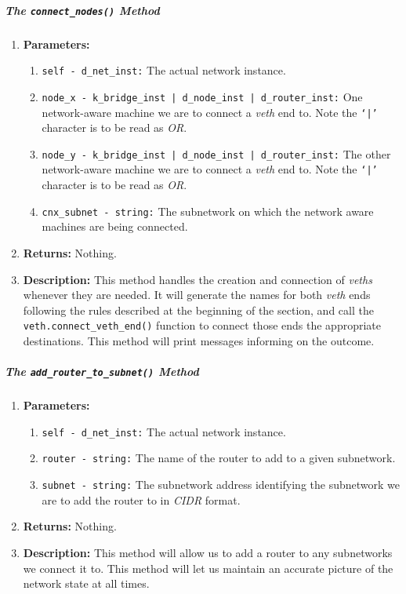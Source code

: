         \subparagraph{The \texttt{connect\_nodes()} Method}
            \begin{enumerate}
                \item \textbf{Parameters:}
                \begin{enumerate}
                    \item \texttt{self - d\_net\_inst:} The actual network instance.
                    \item \texttt{node\_x - k\_bridge\_inst | d\_node\_inst | d\_router\_inst:} One network-aware machine we are to connect a \textit{veth} end to. Note the \texttt{`|'} character is to be read as \textit{OR}.
                    \item \texttt{node\_y - k\_bridge\_inst | d\_node\_inst | d\_router\_inst:} The other network-aware machine we are to connect a \textit{veth} end to. Note the \texttt{`|'} character is to be read as \textit{OR}.
                    \item \texttt{cnx\_subnet - string:} The subnetwork on which the network aware machines are being connected.
                \end{enumerate}
                \item \textbf{Returns:} Nothing.
                \item \textbf{Description:} This method handles the creation and connection of \textit{veths} whenever they are needed. It will generate the names for both \textit{veth} ends following the rules described at the beginning of the section, and call the \texttt{veth.connect\_veth\_end()} function to connect those ends the appropriate destinations. This method will print messages informing on the outcome.
            \end{enumerate}

        \subparagraph{The \texttt{add\_router\_to\_subnet()} Method}
            \begin{enumerate}
                \item \textbf{Parameters:}
                \begin{enumerate}
                    \item \texttt{self - d\_net\_inst:} The actual network instance.
                    \item \texttt{router - string:} The name of the router to add to a given subnetwork.
                    \item \texttt{subnet - string:} The subnetwork address identifying the subnetwork we are to add the router to in \textit{CIDR} format.
                \end{enumerate}
                \item \textbf{Returns:} Nothing.
                \item \textbf{Description:} This method will allow us to add a router to any subnetworks we connect it to. This method will let us maintain an accurate picture of the network state at all times.
            \end{enumerate}

